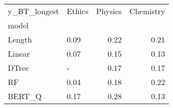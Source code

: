 \begin{tabular}{llrr}
\toprule
y\_BT\_longest & Ethics &  Physics &  Chemistry \\
model  &        &          &            \\
\midrule
Length &   0.09 &     0.22 &       0.21 \\
Linear &   0.07 &     0.15 &       0.13 \\
DTree  &      - &     0.17 &       0.17 \\
RF     &   0.04 &     0.18 &       0.22 \\
BERT\_Q &   0.17 &     0.28 &       0.13 \\
\bottomrule
\end{tabular}
